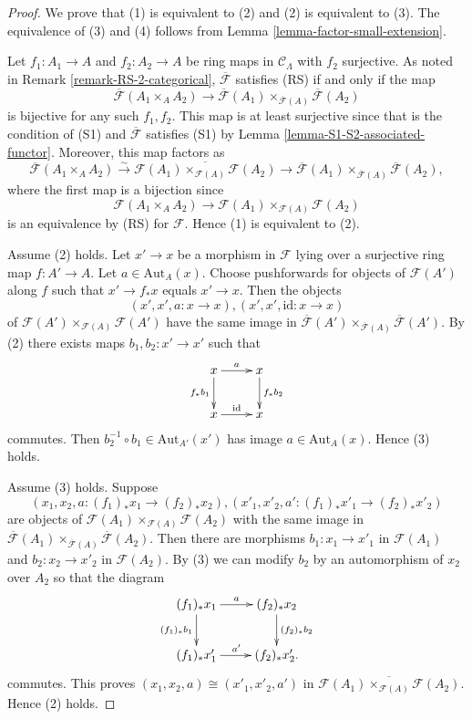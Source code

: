 \begin{proof}
We prove that (1) is equivalent to (2) and (2) is equivalent to (3).  The 
equivalence of (3) and (4) follows from Lemma 
\ref{lemma-factor-small-extension}.  

\medskip \noindent
Let $f_1: A_1 \to A$ and $f_2: A_2 \to A$ be ring maps in 
$\mathcal{C}_\Lambda$ with $f_2$ surjective.  As noted in Remark 
\ref{remark-RS-2-categorical}, $\overline{\mathcal{F}}$ satisfies (RS) if and 
only if the map
\[ 
\overline{\mathcal{F}}(A_1 \times_{A} A_2) \to \overline{\mathcal 
F}(A_1) \times_{\overline{\mathcal{F}}(A)} \overline{\mathcal{F}}(A_2)
\]
is bijective for any such $f_1,f_2$. This map is at least surjective since that 
is the condition of (S1) and $\overline{\mathcal{F}}$ satisfies (S1) by Lemma 
\ref{lemma-S1-S2-associated-functor}.  Moreover, this map factors as
\[ 
\overline{\mathcal{F}}(A_1 \times_{A} A_2) 
\xrightarrow{\sim} \overline{\mathcal{F}(A_1) \times_{\mathcal{F}(A)} \mathcal 
F(A_2)}
\to \overline{\mathcal{F}}(A_1) \times_{\overline{\mathcal{F}}(A)} 
\overline{\mathcal{F}}(A_2),
\]
where the first map is a bijection since 
\[
\mathcal{F}(A_1 \times_{A} A_2) \to \mathcal{F}(A_1) \times_{\mathcal 
F(A)} \mathcal{F}(A_2)
\]
is an equivalence by (RS) for $\mathcal{F}$.  Hence (1) is equivalent to (2).

\medskip \noindent
Assume (2) holds.  Let $x' \to x$  be a morphism in $\mathcal{F}$ lying 
over a surjective ring map $f: A' \to A$.  Let $a \in 
\text{Aut}_{A}(x)$.  Choose pushforwards for objects of $\mathcal{F}(A')$ 
along $f$ such that $x' \to f_* x$ equals $x' \to x$. Then the 
objects
\[ (x',x', a: x \to x), (x',x', \text{id}: x \to x) \]
of $\mathcal{F}(A') \times_{\mathcal{F}(A)} \mathcal{F}(A')$ have the same image 
in $\overline{\mathcal{F}}(A') \times_{\overline{\mathcal{F}}(A)} 
\overline{\mathcal{F}}(A')$.  By (2) there exists maps $b_1,b_2: x' \to 
x'$ such that
\[ 
\xymatrix{
x \ar[r]^{a} \ar[d]_{f_*b_1} & x \ar[d]^{f_*b_2} \\
x \ar[r]^{\text{id}} & x
}
\]
commutes.  Then $b_2^{-1} \circ b_1 \in \text{Aut}_{A'}(x')$ has image $a 
\in \text{Aut}_{A}(x)$.  Hence (3) holds.

\medskip \noindent
Assume (3) holds. Suppose
\[ (x_1,x_2, a: (f_1)_*x_1 \to (f_2)_*x_2), (x'_1,x'_2, a': (f_1)_*x'_1 
\to (f_2)_*x'_2) \]
are objects of $\mathcal{F}(A_1) \times_{\mathcal{F}(A)} \mathcal{F}(A_2)$ with 
the same image in $\overline{\mathcal{F}}(A_1) \times_{\overline{\mathcal{F}}(A)} 
\overline{\mathcal{F}}(A_2)$. Then there are morphisms $b_1: x_1 \to 
x'_1$ in $\mathcal{F}(A_1)$ and $b_2: x_2 \to x'_2$ in $\mathcal 
F(A_2)$. By (3) we can modify $b_2$ by an automorphism of $x_2$ over $A_2$ so 
that the diagram
\[
\xymatrix{
(f_1)_*x_1 \ar[r]^{a} \ar[d]_{(f_1)_*b_1} & (f_2)_*x_2 \ar[d]^{(f_2)_*b_2} \\
(f_1)_*x'_1 \ar[r]^{a'} & (f_2)_*x'_2.
}
\]
commutes. This proves $(x_1,x_2, a) \cong (x'_1,x'_2,a')$ in 
$\overline{\mathcal{F}(A_1) \times_{\mathcal{F}(A)} \mathcal{F}(A_2)}$.  Hence (2) 
holds.
\end{proof}


